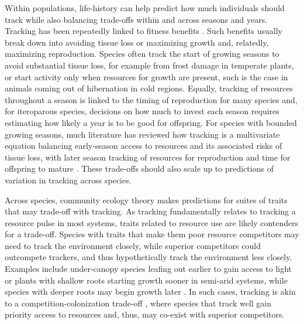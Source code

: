 \documentclass[11pt,letterpaper]{article}
\begin{document}
Within populations, life-history can help predict how much individuals should track while also balancing trade-offs within and across seasons and years. Tracking has been repeatedly linked to fitness benefits \citep[e.g.,][]{farzan2018,deacy2018}. Such benefits usually break down into avoiding tissue loss or maximizing growth and, relatedly, maximizing reproduction. Species often track the start of growing seasons to avoid substantial tissue loss, for example from frost damage in temperate plants, or start activity only when resources for growth are present, such is the case in animals coming out of hibernation in cold regions. Equally, tracking of resources throughout a season is linked to the timing of reproduction for many species and, for iteroparous species, decisions on how much to invest each season requires estimating how likely a year is to be good for offspring. For species with bounded growing seasons, much literature has reviewed how tracking is a multivariate equation balancing early-season access to resources and its associated risks of tissue loss, with later season tracking of resources for reproduction and time for offspring to mature \citep{donohue2002,Morin:2005ye,Burghardt2015}. These trade-offs should also scale up to predictions of variation in tracking across species. 

Across species, community ecology theory makes predictions for suites of traits that may trade-off with tracking. As tracking fundamentally relates to tracking a resource pulse in most systems, traits related to resource use are likely contenders for a trade-off. Species with traits that make them poor resource competitors may need to track the environment closely, while superior competitors could outcompete trackers, and thus hypothetically track the environment less closely. Examples include under-canopy species leafing out earlier to gain access to light \cite{pheberling2019} or plants with shallow roots starting growth sooner in semi-arid systems, while species with deeper roots may begin growth later \citep{Zhu2016BioLetters}. In such cases, tracking is akin to a competition-colonization trade-off \citep{Amarasekare:2003tq}, where species that track well gain priority access to resources and, thus, may co-exist with superior competitors. 
\end{document}
